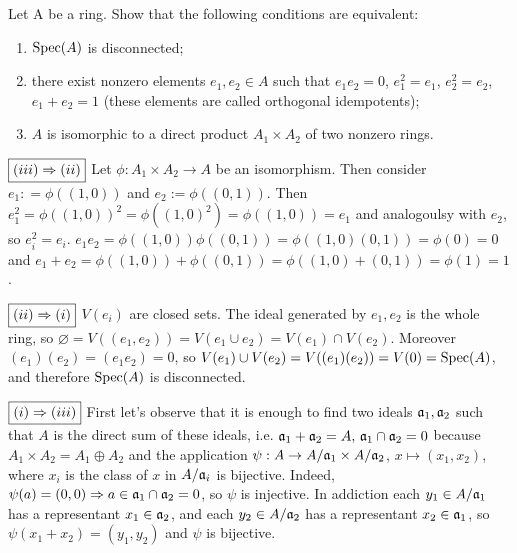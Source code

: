 \begin{ex}
	Let A be a ring. Show that the following conditions are equivalent:
	\begin{enumerate}[label=\roman*)]
		\item $\mathrm{Spec}(A)$ is disconnected;
		\item there exist nonzero elements $e_1, e_2 \in A$ such that $e_1e_2 = 0$, $e_1^2 = e_1$, $e_2^2 = e_2$, $e_1 + e_2 = 1$ (these elements are called orthogonal idempotents);
		\item $A$ is isomorphic to a direct product $A_1 \times A_2$ of two nonzero rings.
	\end{enumerate}
\end{ex}

\begin{sol}
	$\boxed{(iii) \Rightarrow (ii)}$ Let $\phi: A_1 \times A_2 \to A$ be an isomorphism. Then consider $e_1: = \phi((1,0))$ and $e_2 := \phi((0,1))$. Then $e_1^2 = \phi((1,0))^2 = \phi((1,0)^2) = \phi((1,0)) = e_1$ and analogoulsy with $e_2$, so $e_i^2 = e_i$. $e_1 e_2 = \phi((1,0))\phi((0,1)) = \phi((1,0)(0,1)) = \phi(0) = 0$ and $e_1 + e_2 = \phi((1,0)) + \phi((0,1)) = \phi((1,0)+ (0,1)) = \phi(1) = 1$.

	$\boxed{(ii) \Rightarrow (i)}$ $V(e_i)$ are closed sets. The ideal generated by $e_1, e_2$ is the whole ring, so $\varnothing = V((e_1,e_2)) = V(e_1 \cup e_2) = V(e_1) \cap V(e_2)$. Moreover $(e_1)(e_2) = (e_1e_2) = 0$, so $V(e_1) \cup V(e_2) = V((e_1)(e_2)) = V(0) = \mathrm{Spec}(A)$, and therefore $\mathrm{Spec}(A)$ is disconnected.

	$\boxed{(i) \Rightarrow (iii)}$ First let's observe that it is enough to find two ideals $\mathfrak{a}_1, \mathfrak{a}_2$ such that $A$ is the direct sum of these ideals, i.e. $\mathfrak{a}_1 + \mathfrak{a}_2 = A, \, \mathfrak{a}_1 \cap \mathfrak{a}_2 = 0$ because $A_1 \times A_2 = A_1 \oplus A_2$ and the application $\psi: A \to A/\mathfrak{a}_1 \times A/\mathfrak{a}_2$, $x \mapsto (x_1, x_2)$, where $x_i$ is the class of $x$ in $A/\mathfrak{a}_i$ is bijective. Indeed, $\psi(a) = (0,0) \Rightarrow a \in \mathfrak{a}_1 \cap \mathfrak{a}_2 = 0$, so $\psi$ is injective. In addiction each $y_1 \in A/\mathfrak{a}_1$ has a representant $x_1 \in \mathfrak{a}_2$, and each $y_2 \in A/\mathfrak{a}_2$ has a representant $x_2 \in \mathfrak{a}_1$, so $\psi(x_1+x_2) = (y_1, y_2)$ and $\psi$ is bijective.


\end{sol}
